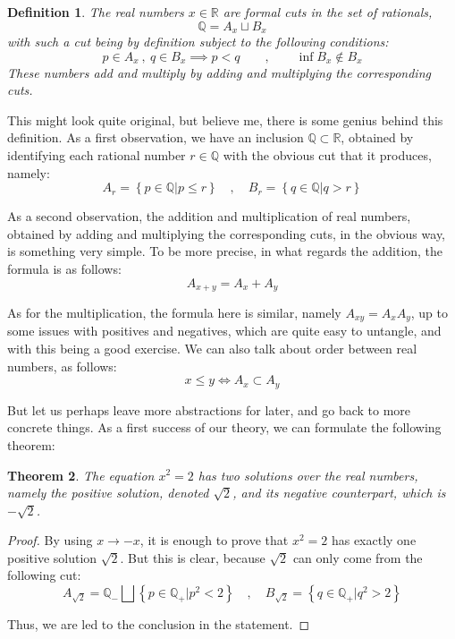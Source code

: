 \documentclass[12pt]{amsbook}
\newtheorem{theorem}{Theorem}[chapter]
\newtheorem{definition}[theorem]{Definition}
\begin{document}
\begin{definition}
The real numbers $x\in\mathbb R$ are formal cuts in the set of rationals,
$$\mathbb Q=A_x\sqcup B_x$$
with such a cut being by definition subject to the following conditions:
$$p\in A_x\ ,\ q\in B_x\implies p<q\qquad,\qquad\inf B_x\notin B_x$$
These numbers add and multiply by adding and multiplying the corresponding cuts.
\end{definition}

This might look quite original, but believe me, there is some genius behind this definition. As a first observation, we have an inclusion $\mathbb Q\subset\mathbb R$, obtained by identifying each rational number $r\in\mathbb Q$ with the obvious cut that it produces, namely:
$$A_r=\left\{p\in\mathbb Q\Big|p\leq r\right\}
\quad,\quad
B_r=\left\{q\in\mathbb Q\Big|q>r\right\}$$

As a second observation, the addition and multiplication of real numbers, obtained by adding and multiplying the corresponding cuts, in the obvious way, is something very simple. To be more precise, in what regards the addition, the formula is as follows:
$$A_{x+y}=A_x+A_y$$ 

As for the multiplication, the formula here is similar, namely $A_{xy}=A_xA_y$, up to some issues with positives and negatives, which are quite easy to untangle, and with this being a good exercise. We can also talk about order between real numbers, as follows:
$$x\leq y\iff A_x\subset A_y$$

But let us perhaps leave more abstractions for later, and go back to more concrete things. As a first success of our theory, we can formulate the following theorem:

\begin{theorem}
The equation $x^2=2$ has two solutions over the real numbers, namely the positive solution, denoted $\sqrt{2}$, and its negative counterpart, which is $-\sqrt{2}$.
\end{theorem}

\begin{proof}
By using $x\to-x$, it is enough to prove that $x^2=2$ has exactly one positive solution $\sqrt{2}$. But this is clear, because $\sqrt{2}$ can only come from the following cut:
$$A_{\sqrt{2}}=\mathbb Q_-\bigsqcup\left\{p\in\mathbb Q_+\Big|p^2<2\right\}\quad,\quad B_{\sqrt{2}}=\left\{q\in\mathbb Q_+\Big|q^2>2\right\}$$

Thus, we are led to the conclusion in the statement.
\end{proof}
\end{document}
